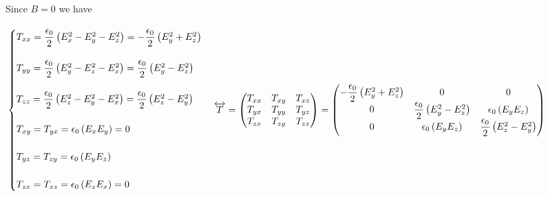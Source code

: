 \documentclass[fleqn]{article}
\begin{document}
\begin{enumerate}
\begin{enumerate}
{            Since $B=0$ we have
            \\
            \\
            $
              \\
              \begin{cases}
                T_{xx}=\dfrac{\epsilon_0}{2} \left(E_x^2-E_y^2-E_z^2\right)
                =-\dfrac{\epsilon_0}{2} \left(E_y^2+E_z^2\right)
                \\
                \\
                T_{yy}=\dfrac{\epsilon_0}{2} \left(E_y^2-E_z^2-E_x^2\right)
                =\dfrac{\epsilon_0}{2} \left(E_y^2-E_z^2\right)
                \\
                \\
                T_{zz}=\dfrac{\epsilon_0}{2} \left(E_z^2-E_y^2-E_x^2\right)
                =\dfrac{\epsilon_0}{2} \left(E_z^2-E_y^2\right)
                \\
                \\
                T_{xy}=T_{yx}=\epsilon_0 \left(E_x E_y\right)=0
                \\
                \\
                T_{yz}=T_{zy}=\epsilon_0 \left(E_y E_z\right)
                \\
                \\
                T_{zx}=T_{xz}=\epsilon_0 \left(E_z E_x\right)=0
              \end{cases}
              \\
              \\
              \\
              \overleftrightarrow{T}=\begin{pmatrix}
                T_{xx} & T_{xy} & T_{xz} 
                \\
                T_{yx} & T_{yy} & T_{yz} 
                \\
                T_{zx} & T_{zy} & T_{zz} 
              \end{pmatrix}=\begin{pmatrix}
                -\dfrac{\epsilon_0}{2} \left(E_y^2+E_z^2\right) & 0 & 0 
                \\
                0 & \dfrac{\epsilon_0}{2} \left(E_y^2-E_z^2\right) & \epsilon_0 \left(E_y E_z\right) 
                \\
                0 & \epsilon_0 \left(E_y E_z\right) & \dfrac{\epsilon_0}{2} \left(E_z^2-E_y^2\right) 
              \end{pmatrix}
            $
            \\
            \\
          }
        

\end{enumerate}
\end{enumerate}
\end{document}
